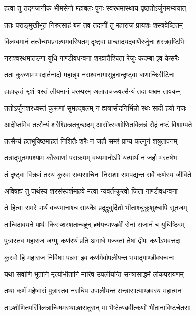 \twolineshloka
{हत्वा तु तद्गजानीकं भीमसेनो महाबलः}
{पुनः स्वरथमास्थाय पृष्ठतोऽर्जुनमभ्ययात्}


\twolineshloka
{ततः पराङ्मुखीभूतं निरुत्साहं बलं तव}
{तदानीं तु महाराज प्रायशः शस्त्रवेष्टितम्}


\twolineshloka
{विलम्बमानं तत्सैन्यभप्रगल्भमवस्थितम्}
{दृष्ट्वा प्राच्छादयद्बाणैरर्जुनः शस्त्रवृष्टिभिः}


\twolineshloka
{नराश्वरथमातङ्गा युधि गाण्डीवधन्वना}
{शरव्रातैश्चिता रेजुः कदम्बा इव केसरैः}


\twolineshloka
{ततः कुरुणामभवदार्तनादो महान्नृप}
{नराश्वनागासुहनान्दृष्ट्वा बाणान्किरीटिनः}


\twolineshloka
{हाहाकृतं भृशं त्रस्तं लीयमानं परस्परम्}
{अलातचक्रवत्सैन्यं तदा बभ्राम तावकम्}


\twolineshloka
{ततोऽर्जुनशरध्वस्तं कुरूणां सुमहद्बलम्}
{न ह्यत्रासीदनिर्भिन्नो रथः सादी हयो गजः}


\twolineshloka
{आदीप्तमिव तत्सैन्यं शरैश्छिन्नतनुच्छदम्}
{आसीत्स्वशोणितक्लिन्नं रौद्रं नष्टं विशाम्पते}


\twolineshloka
{तत्सैन्यं हतभूयिष्ठमाहतं निशितैः शरैः}
{न जहौ समरं प्राप्य फल्गुनं शत्रुतापनम्}


\twolineshloka
{तत्राद्भुतमपश्याम कौरवाणां पराक्रमम्}
{वध्यमानोऽपि यत्पार्थं न जहौ भरतर्षभ}


\twolineshloka
{तं दृष्ट्वा विक्रमं तस्य कुरवः सव्यसाचिनः}
{निराशाः समपद्यन्त सर्वे कर्णस्य जीविते}


\twolineshloka
{अविषह्यं तु पार्थस्य शरसंस्पर्शमाहवे}
{मत्वा न्यवर्तन्कुरवो जिता गाण्डीवधन्वना}


\twolineshloka
{ते हित्वा समरे पार्थं वध्यमानाश्च सायकैः}
{प्रदुद्रुवुर्दिशो भीताश्चुक्रुशुश्चापि सूतजम्}


\twolineshloka
{तान्विद्रावयते पार्थः किरञ्शरशतान्बहून्}
{हर्षयन्पाण्डवीं सेनां राजानं च युधिष्ठिरम्}


\twolineshloka
{पुत्रास्तव महाराज जग्मुः कर्णरथं प्रति}
{अगाधे मज्जतां तेषां द्वीपः कर्णोऽभवत्तदा}


\twolineshloka
{कुरवो हि महाराज निर्विषाः पन्नगा इव}
{कर्णमेवोपलीयन्त भयाद्गाण्डीवघन्वनः}


\twolineshloka
{यथा सर्वाणि भूतानि मृत्योर्भीतानि मारिष}
{उपलीयन्ति सन्त्रासाद्धर्मं लोकपरायणम्}


\twolineshloka
{तथा कर्णं महेष्वासं पुत्रास्तव नराधिप}
{उपालीयन्त सन्त्रासात्पाण्डवस्य महात्मनः}


\twolineshloka
{ताञ्शोणितपरिक्लिन्नान्विषमस्थाञ्शरातुरान्}
{मा भैष्टेत्यब्रवीत्कर्णो भीतानाविष्टचेतसः}



